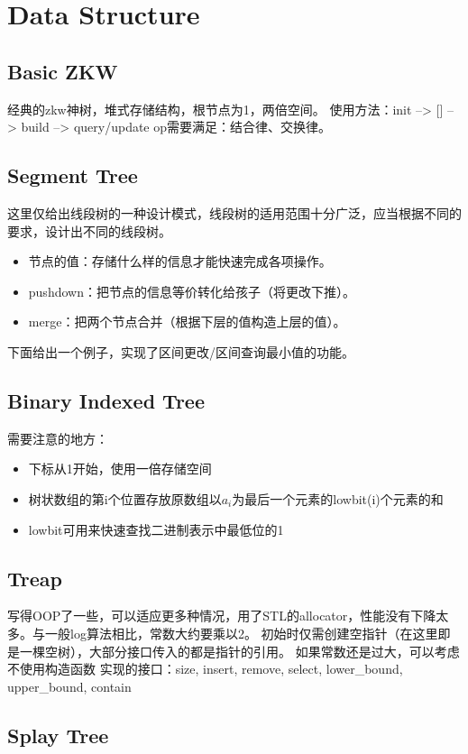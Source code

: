 \section{Data Structure}
	\subsection{Basic ZKW}
		\begin{flushleft}
			经典的zkw神树，堆式存储结构，根节点为1，两倍空间。
			\linebreak 使用方法：init --> [] --> build --> query/update
			\linebreak op需要满足：结合律、交换律。
		\end{flushleft}
		
	\subsection{Segment Tree}
		\begin{flushleft}
			这里仅给出线段树的一种设计模式，线段树的适用范围十分广泛，应当根据不同的要求，设计出不同的线段树。
			\begin{itemize}
				\item 节点的值：存储什么样的信息才能快速完成各项操作。
				\item pushdown：把节点的信息等价转化给孩子（将更改下推）。
				\item merge：把两个节点合并（根据下层的值构造上层的值）。
			\end{itemize}
			下面给出一个例子，实现了区间更改/区间查询最小值的功能。
		\end{flushleft}
		
	\subsection{Binary Indexed Tree}
		\begin{flushleft}
			需要注意的地方：
			\begin{itemize}
				\item 下标从1开始，使用一倍存储空间
				\item 树状数组的第i个位置存放原数组以$a_{i}$为最后一个元素的lowbit(i)个元素的和
				\item lowbit可用来快速查找二进制表示中最低位的1
			\end{itemize}
		\end{flushleft}
		
	\subsection{Treap}
		\begin{flushleft}
			写得OOP了一些，可以适应更多种情况，用了STL的allocator，性能没有下降太多。与一般log算法相比，常数大约要乘以2。
			\linebreak 初始时仅需创建空指针（在这里即是一棵空树），大部分接口传入的都是指针的引用。
			\linebreak 如果常数还是过大，可以考虑不使用构造函数
			\linebreak 实现的接口：size, insert, remove, select, lower\_bound, upper\_bound, contain
		\end{flushleft}
		
	\subsection{Splay Tree}
		